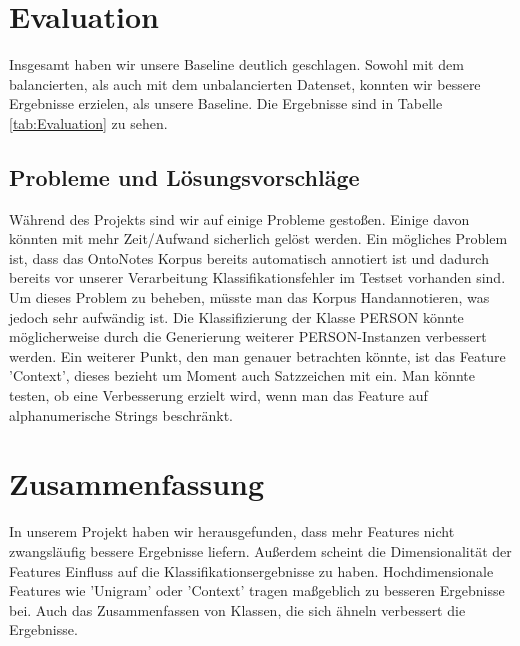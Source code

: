 \documentclass[a4paper, 11pt]{article}
\begin{document}
\section{Evaluation}
Insgesamt haben wir unsere Baseline deutlich geschlagen. Sowohl mit dem balancierten, als auch mit dem unbalancierten Datenset, konnten wir bessere Ergebnisse erzielen, als unsere Baseline. Die Ergebnisse sind in Tabelle \ref{tab:Evaluation} zu sehen.
\subsection{Probleme und Lösungsvorschläge}
Während des Projekts sind wir auf einige Probleme gestoßen. Einige davon könnten mit mehr Zeit/Aufwand sicherlich gelöst werden. Ein mögliches Problem ist, dass das OntoNotes Korpus bereits automatisch annotiert ist und dadurch bereits vor unserer Verarbeitung Klassifikationsfehler im Testset vorhanden sind. Um dieses Problem zu beheben, müsste man das Korpus Handannotieren, was jedoch sehr aufwändig ist. Die Klassifizierung der Klasse PERSON könnte möglicherweise durch die Generierung weiterer PERSON-Instanzen verbessert werden. Ein weiterer Punkt, den man genauer betrachten könnte, ist das Feature 'Context', dieses bezieht um Moment auch Satzzeichen mit ein. Man könnte testen, ob eine Verbesserung erzielt wird, wenn man das Feature auf alphanumerische Strings beschränkt.
\section{Zusammenfassung}
In unserem Projekt haben wir herausgefunden, dass mehr Features nicht zwangsläufig bessere Ergebnisse liefern. Außerdem scheint die Dimensionalität der Features Einfluss auf die Klassifikationsergebnisse zu haben. Hochdimensionale Features wie 'Unigram' oder 'Context' tragen maßgeblich zu besseren Ergebnisse bei. Auch das Zusammenfassen von Klassen, die sich ähneln verbessert die Ergebnisse.
\newpage
\end{document}

